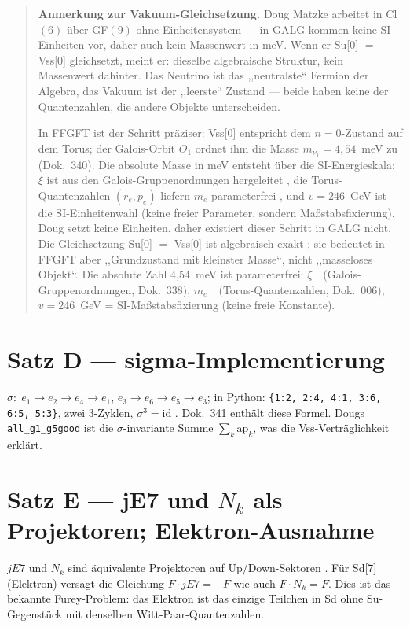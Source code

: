 \begin{quote}\small
\textbf{Anmerkung zur Vakuum-Gleichsetzung.}
Doug Matzke arbeitet in Cl$(6)$ über GF$(9)$ ohne Einheitensystem --- in GALG
kommen keine SI-Einheiten vor, daher auch kein Massenwert in meV. Wenn er Su[0] $=$ Vss[0] gleichsetzt, meint er: dieselbe
algebraische Struktur, kein Massenwert dahinter. Das Neutrino ist das
,,neutralste`` Fermion der Algebra, das Vakuum ist der ,,leerste`` Zustand ---
beide haben keine der Quantenzahlen, die andere Objekte unterscheiden.

In FFGFT ist der Schritt präziser: Vss[0] entspricht dem $n=0$-Zustand auf
dem Torus; der Galois-Orbit $O_1$ ordnet ihm die Masse $m_{\nu_1}=4{,}54$~meV
zu (Dok.~340). Die absolute Masse in meV entsteht über die SI-Energieskala:
$\xi$ ist aus den Galois-Gruppenordnungen hergeleitet \KM,
die Torus-Quantenzahlen $(r_e, p_e)$ liefern $m_e$ parameterfrei \KM,
und $v=246$~GeV ist die SI-Einheitenwahl (keine freier Parameter,
sondern Maßstabsfixierung). Doug setzt keine Einheiten, daher
existiert dieser Schritt in GALG nicht. Die Gleichsetzung Su[0] $=$ Vss[0]
ist algebraisch exakt \BM; sie bedeutet in FFGFT aber ,,Grundzustand mit
kleinster Masse``, nicht ,,masseloses Objekt``.
Die absolute Zahl 4{,}54~meV ist parameterfrei: $\xi$~\KM\ (Galois-Gruppenordnungen,
Dok.~338), $m_e$~\KM\ (Torus-Quantenzahlen, Dok.~006), $v=246$~GeV =
SI-Maßstabsfixierung (keine freie Konstante).
\end{quote}


\section{Satz D --- sigma-Implementierung}

$\sigma:\; e_1 \to e_2 \to e_4 \to e_1$, $e_3 \to e_6 \to e_5 \to e_3$;
in Python: \texttt{\{1:2, 2:4, 4:1, 3:6, 6:5, 5:3\}}, zwei 3-Zyklen, $\sigma^3=\mathrm{id}$ \BM.
Dok.~341 enth\"alt diese Formel. Dougs \texttt{all\_g1\_g5good} ist die $\sigma$-invariante
Summe $\sum_k \mathrm{ap}_k$, was die Vss-Vertr\"aglichkeit erkl\"art.

\section{Satz E --- jE7 und $N_k$ als Projektoren; Elektron-Ausnahme}

$jE7$ und $N_k$ sind \"aquivalente Projektoren auf Up/Down-Sektoren \BM.
F\"ur Sd[7] (Elektron) versagt die Gleichung $F \cdot jE7 = -F$ wie auch $F \cdot N_k = F$.
Dies ist das bekannte Furey-Problem: das Elektron ist das einzige Teilchen in Sd ohne
Su-Gegenst\"uck mit denselben Witt-Paar-Quantenzahlen.

